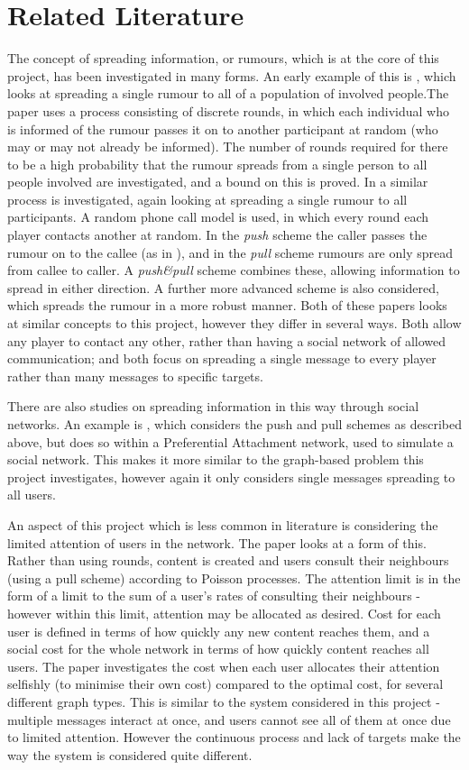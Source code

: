 \documentclass[bsc,frontabs,twoside,singlespacing,parskip,deptreport]{infthesis}     %
\begin{document}
\section{Related Literature}
The concept of spreading information, or rumours, which is at the core of this project, has been investigated in many forms. An early example of this is \cite{Pittel87}, which looks at spreading a single rumour to all of a population of involved people.The paper uses a process consisting of discrete rounds, in which each individual who is informed of the rumour passes it on to another participant at random (who may or may not already be informed). The number of rounds required for there to be a high probability that the rumour spreads from a single person to all people involved are investigated, and a bound on this is proved. In \cite{KarpSSV00} a similar process is investigated, again looking at spreading a single rumour to all participants. A random phone call model is used, in which every round each player contacts another at random. In the \textit{push} scheme the caller passes the rumour on to the callee (as in \cite{Pittel87}), and in the \textit{pull} scheme rumours are only spread from callee to caller. A \textit{push\&pull} scheme combines these, allowing information to spread in either direction. A further more advanced scheme is also considered, which spreads the rumour in a more robust manner. Both of these papers looks at similar concepts to this project, however they differ in several ways. Both allow any player to contact any other, rather than having a social network of allowed communication; and both focus on spreading a single message to every player rather than many messages to specific targets.

There are also studies on spreading information in this way through social networks. An example is \cite{SocialNetworkRumours}, which considers the push and pull schemes as described above, but does so within a Preferential Attachment network, used to simulate a social network. This makes it more similar to the graph-based problem this project investigates, however again it only considers single messages spreading to all users.

An aspect of this project which is less common in literature is considering the limited attention of users in the network. The paper \cite{AllocatingAttention} looks at a form of this. Rather than using rounds, content is created and users consult their neighbours (using a pull scheme) according to Poisson processes. The attention limit is in the form of a limit to the sum of a user's rates of consulting their neighbours - however within this limit, attention may be allocated as desired. Cost for each user is defined in terms of how quickly any new content reaches them, and a social cost for the whole network in terms of how quickly content reaches all users. The paper investigates the cost when each user allocates their attention selfishly (to minimise their own cost) compared to the optimal cost, for several different graph types. This is similar to the system considered in this project - multiple messages interact at once, and users cannot see all of them at once due to limited attention. However the continuous process and lack of targets make the way the system is considered quite different.
\end{document}
